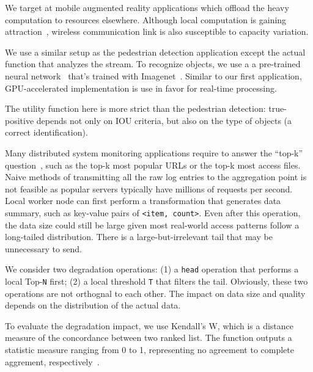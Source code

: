  We target at mobile augmented reality applications
which offload the heavy computation to resources elsewhere. Although local
computation is gaining attraction~\cite{satyanarayanan2009case, zhang2015cloud},
wireless communication link is also susceptible to capacity variation.

We use a similar setup as the pedestrian detection application except the actual
function that analyzes the stream. To recognize objects, we use a a pre-trained
neural network~\cite{darknet13} that's trained with
Imagenet~\cite{krizhevsky2012imagenet}. Similar to our first application,
GPU-accelerated implementation is use in favor for real-time processing.

The utility function here is more strict than the pedestrian detection:
true-positive depends not only on IOU criteria, but also on the type of objects
(a correct identification).

 Many distributed system monitoring applications
require to answer the ``top-k'' question~\cite{babcock2003distributed}, such as
the top-k most popular URLs or the top-k most access files. Naive methods of
transmitting all the raw log entries to the aggregation point is not feasible as
popular servers typically have millions of requests per second. Local worker
node can first perform a transformation that generates data summary, such as
key-value pairs of \texttt{<item, count>}. Even after this operation, the data
size could still be large given most real-world access patterns follow a
long-tailed distribution. There is a large-but-irrelevant tail that may be
unnecessary to send.

We consider two degradation operations: (1) a \texttt{head} operation that
performs a local Top-\texttt{N} first; (2) a local threshold \texttt{T} that
filters the tail. Obviously, these two operations are not orthognal to each
other. The impact on data size and quality depends on the distribution of the
actual data.

To evaluate the degradation impact, we use Kendall's W, which is a distance
measure of the concordance between two ranked list. The function outputs a
statistic measure ranging from 0 to 1, representing no agreement to complete
aggrement, respectively~\cite{abdi2007kendall}.

